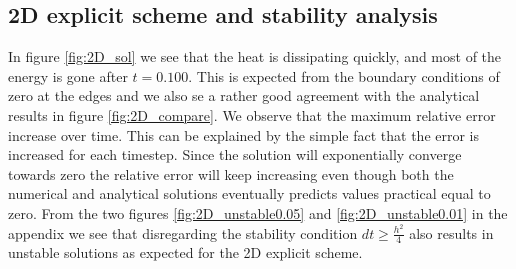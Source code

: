 \documentclass[%
 reprint,
nofootinbib,
aps,
]{revtex4-1}
\begin{document}
\subsection{2D explicit scheme and stability analysis}
In figure \ref{fig:2D_sol} we see that the heat is dissipating quickly, and most of the energy is gone after $t = 0.100$. This is expected from the boundary conditions of zero at the edges and we also se a rather good agreement with the analytical results in figure \ref{fig:2D_compare}. We observe that the maximum relative error increase over time. This can be explained by the simple fact that the error is increased for each timestep. Since the solution will exponentially converge towards zero the relative error will keep increasing even though both the numerical and analytical solutions eventually predicts values practical equal to zero.
From the two figures \ref{fig:2D_unstable0.05} and \ref{fig:2D_unstable0.01} in the appendix we see that disregarding the stability condition $dt \geq \frac{h^2}{4}$ also results in unstable solutions as expected for the 2D explicit scheme.


\end{document}

